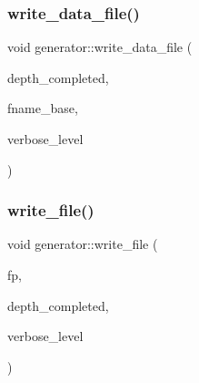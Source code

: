 \mbox{\label{classgenerator_aa25b0081c8700b91500fd47e0424f4cb}} 
\subsubsection{\texorpdfstring{write\+\_\+data\+\_\+file()}{write\_data\_file()}}
{\footnotesize\ttfamily void generator\+::write\+\_\+data\+\_\+file (\begin{DoxyParamCaption}\item[{\mbox{\hyperlink{galois_8h_a09fddde158a3a20bd2dcadb609de11dc}{I\+NT}}}]{depth\+\_\+completed,  }\item[{const \mbox{\hyperlink{galois_8h_ab6cc7b4aeb6ea31aba2b3fbfc83ff5e6}{B\+Y\+TE}} $\ast$}]{fname\+\_\+base,  }\item[{\mbox{\hyperlink{galois_8h_a09fddde158a3a20bd2dcadb609de11dc}{I\+NT}}}]{verbose\+\_\+level }\end{DoxyParamCaption})}

\mbox{\label{classgenerator_a7a9c651e509947c537f896ecfa12b4a6}} 
\subsubsection{\texorpdfstring{write\+\_\+file()}{write\_file()}}
{\footnotesize\ttfamily void generator\+::write\+\_\+file (\begin{DoxyParamCaption}\item[{ofstream \&}]{fp,  }\item[{\mbox{\hyperlink{galois_8h_a09fddde158a3a20bd2dcadb609de11dc}{I\+NT}}}]{depth\+\_\+completed,  }\item[{\mbox{\hyperlink{galois_8h_a09fddde158a3a20bd2dcadb609de11dc}{I\+NT}}}]{verbose\+\_\+level }\end{DoxyParamCaption})}

\mbox{\label{classgenerator_a68629f7faf4c4931f397761f1fdb1463}} 
